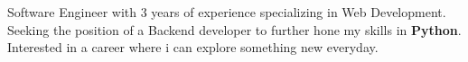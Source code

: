 

\begin{cvparagraph}

Software Engineer with 3 years of experience specializing in Web Development. Seeking the position of a Backend developer to further hone my skills in \textbf{Python}. Interested in a career where i
can explore something new everyday.
\end{cvparagraph}
